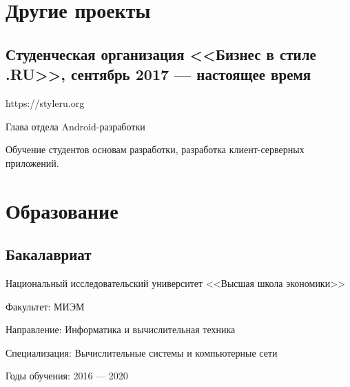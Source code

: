 \documentclass[a4paper,12pt]{article}
\begin{document}
    \section*{Другие проекты}

    \subsection*{Студенческая организация <<Бизнес в стиле .RU>>, сентябрь 2017 --- настоящее время}

    https://styleru.org\par
    Глава отдела Android-разработки\par
    Обучение студентов основам разработки, разработка клиент-серверных приложений.  

    \section*{Образование}

    \subsection*{Бакалавриат}

    Национальный исследовательский университет <<Высшая школа экономики>>\par
    Факультет: МИЭМ\par
    Направление: Информатика и вычислительная техника\par
    Специализация: Вычислительные системы и компьютерные сети\par
    Годы обучения: 2016 --- 2020
\end{document}
